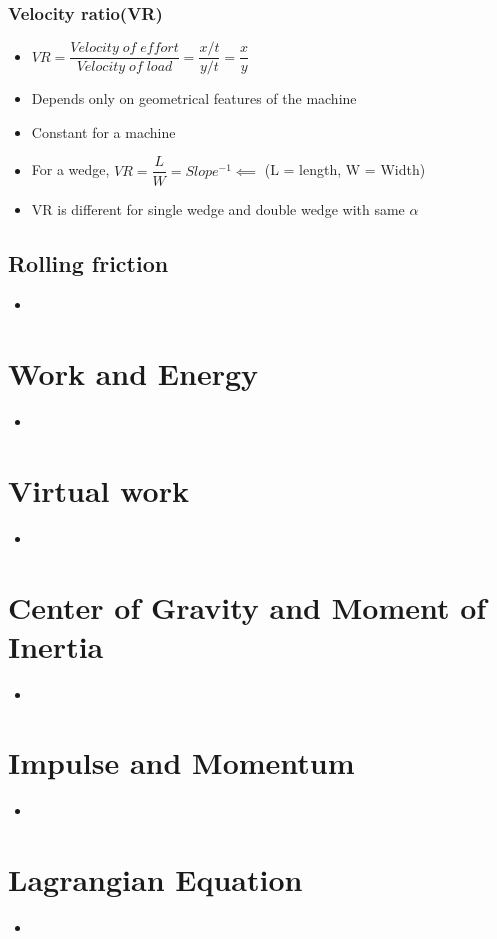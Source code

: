 \documentclass[8pt]{report}
\begin{document}
\subsection{Velocity ratio(VR)}
	\begin{itemize}
		\item $\boxed{VR = \dfrac{Velocity\;of\;effort}{Velocity\;of\;load} = \dfrac{x/t}{y/t} = \dfrac{x}{y}}$
		\item Depends only on geometrical features of the machine
		\item Constant for a machine
		\item For a wedge, $\boxed{VR = \dfrac{L}{W}} = Slope^{-1} \impliedby$ (L = length, W = Width)
		\item VR is different for single wedge and double wedge with same $\alpha$
	\end{itemize}\hrulefill
\section{Rolling friction}
	\begin{itemize}
		\item 
	\end{itemize}
	
	
	
\chapter{Work and Energy}
	\begin{itemize}
		\item
	\end{itemize}
\chapter{Virtual work}
	\begin{itemize}
		\item
	\end{itemize}
\chapter{Center of Gravity and Moment of Inertia}
	\begin{itemize}
		\item
	\end{itemize}
\chapter{Impulse and Momentum}
	\begin{itemize}
		\item
	\end{itemize}
\chapter{Lagrangian Equation}
	\begin{itemize}
		\item
	\end{itemize}
\end{document}
